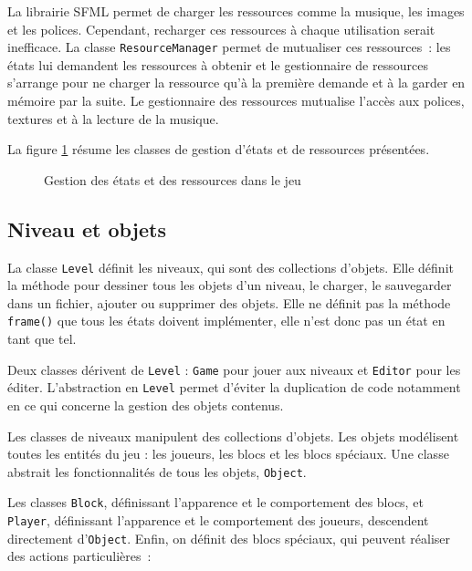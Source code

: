 La librairie SFML permet de charger les ressources comme la musique,
les images et les polices. Cependant, recharger ces ressources à chaque
utilisation serait inefficace. La classe \texttt{ResourceManager} permet
de mutualiser ces ressources~: les états lui demandent les ressources
à obtenir et le gestionnaire de ressources s'arrange pour ne charger
la ressource qu'à la première demande et à la garder en mémoire par la suite.
Le gestionnaire des ressources mutualise l'accès aux polices, textures
et à la lecture de la musique.

La figure \ref{fig:analyse-uml-state} résume les classes de gestion
d'états et de ressources présentées.

\begin{figure}[p!]
    \centering
    
    \caption{Gestion des états et des ressources dans le jeu}
    \label{fig:analyse-uml-state}
\end{figure}
\restoregeometry

\subsection{Niveau et objets}

La classe \texttt{Level} définit les niveaux, qui sont des collections
d'objets. Elle définit la méthode pour dessiner tous les objets d'un niveau,
le charger, le sauvegarder dans un fichier, ajouter ou supprimer des objets.
Elle ne définit pas la méthode \texttt{frame()} que tous les états doivent
implémenter, elle n'est donc pas un état en tant que tel.

Deux classes dérivent de \texttt{Level} : \texttt{Game} pour jouer aux
niveaux et \texttt{Editor} pour les éditer. L'abstraction en
\texttt{Level} permet d'éviter la duplication de code notamment en
ce qui concerne la gestion des objets contenus.

Les classes de niveaux manipulent des collections d'objets. Les objets
modélisent toutes les entités du jeu : les joueurs, les blocs et les
blocs spéciaux. Une classe abstrait les fonctionnalités de tous les objets,
\texttt{Object}.

Les classes \texttt{Block}, définissant l'apparence et le comportement
des blocs, et \texttt{Player}, définissant l'apparence et le comportement
des joueurs, descendent directement d'\texttt{Object}. Enfin, on définit
des blocs spéciaux, qui peuvent réaliser des actions particulières~:

